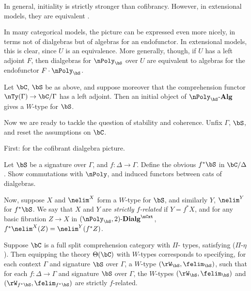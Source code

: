 \documentclass{amsart}
\newcommand{\Alg}[1]{{#1}\text{-}\mathbf{Alg}}
\newcommand{\Dialg}[2]{(#1,2)\text{-}\mathbf{Dialg}}
\begin{document}

In general, initiality is strictly stronger than cofibrancy.
However, in extensional models, they are equivalent \cite{initial-equiv-cofibrant-ref?}.

In many categorical models, the picture can be expressed even more nicely, in terms not of dialgebras but of algebras for an endofunctor.
In extensional models, this is clear, since $U$ is an equivalence.
More generally, though, if $U$ has a left adjoint $F$, then dialgebras for $\nPoly_\bS$ over $U$ are equivalent to algebras for the endofunctor $F \cdot \nPoly_\bS$.

\begin{prop}
Let $\bC$, $\bS$ be as above, and suppose moreover that the comprehension functor $\nTy(\Gamma) \to \bC/\Gamma$ has a left adjoint.
Then an initial object of $\Alg{\nPoly_\bS}$ gives a $W$-type for $\bS$.
\end{prop}


Now we are ready to tackle the question of stability and coherence.
Unfix $\Gamma$, $\bS$, and reset the assumptions on $\bC$.

First: for the cofibrant dialgebra picture.

Let $\bS$ be a signature over $\Gamma$, and $f \colon \Delta \to \Gamma$.
Define the obvious $f^*\bS$ in $\bC/\Delta$.
Show commutations with $\nPoly$, and induced functors between cats of dialgebras.

Now, suppose $X$ and $\nelim^X$ form a $W$-type for $\bS$, and similarly $Y$, $\nelim^Y$ for $f^* \bS$.
We say that $X$ and $Y$ are \emph{strictly $f$-related} if $Y = f^* X$, and for any basic fibration $Z \to X$ in $\Dialg{\nPoly_\bS}{U}^{\nCxt}$, $f^* \nelim^X(Z) = \nelim^Y(f^* Z)$.

\begin{prop}
Suppose $\bC$ is a full split comprehension category with $\Pi$- types, satisfying ($\Pi$-$\eta$).
Then equipping the theory $\Th(\bC)$ with $W$-types corresponds to specifying, for each context $\Gamma$ and signature $\bS$ over $\Gamma$, a $W$-type $(\rW_\bS,\felim_\bS)$, such that for each $f \colon \Delta \to \Gamma$ and signature $\bS$ over $\Gamma$, the $W$-types $(\rW_\bS,\felim_\bS)$ and $(\rW_{f^*\bS},\felim_{f^*\bS})$ are strictly $f$-related.
\end{prop}
\end{document}

